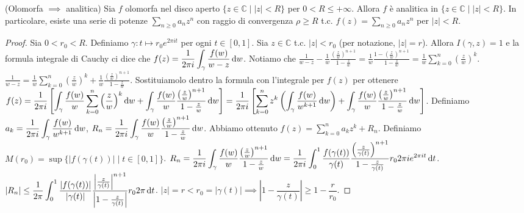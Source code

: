 \begin{thm}
  (Olomorfa $\implies$ analitica) Sia $f$ olomorfa nel disco aperto $\{z \in \mathbb{C} \mid |z|<R\}$ per $0<R\le+\infty$. Allora $f$ è analitica in $\{z \in \mathbb{C} \mid |z|<R\}$. In particolare, esiste una serie di potenze $\displaystyle \sum_{n \ge 0} a_nz^n$ con raggio di convergenza $\rho \ge R$ t.c. $\displaystyle f(z)=\sum_{n \ge 0} a_nz^n$ per $|z|<R$.
\end{thm}

\begin{proof}
  Sia $0<r_0<R$. Definiamo $\gamma:t \longmapsto r_0e^{2\pi i t}$ per ogni $t \in [0,1]$. Sia $z \in \mathbb{C}$ t.c. $|z|<r_0$ (per notazione, $|z|=r$). Allora $I(\gamma,z)=1$ e la formula integrale di Cauchy ci dice che $\displaystyle f(z)=\dfrac{1}{2\pi i}\int_{\gamma}\frac{f(w)}{w-z}\mathop{}\!\mathrm{d} w$.
  Notiamo che $\displaystyle \frac{1}{w-z}-\frac{1}{w}\frac{\left(\frac{z}{w}\right)^{n+1}}{1-\frac{z}{w}}=\frac{1}{w}\frac{1-\left(\frac{z}{w}\right)^{n+1}}{1-\frac{z}{w}}=\frac{1}{w}\sum_{k=0}^n \left(\frac{z}{w}\right)^k$.
  $\displaystyle \frac{1}{w-z}=\frac{1}{w}\sum_{k=0}^n \left(\frac{z}{w}\right)^k+\frac{1}{w}\frac{\left(\frac{z}{w}\right)^{n+1}}{1-\frac{z}{w}}$.
  Sostituiamolo dentro la formula con l'integrale per $f(z)$ per ottenere $\displaystyle f(z)=\frac{1}{2\pi i}\left[\int_{\gamma}\frac{f(w)}{w}\sum_{k=0}^n \left(\frac{z}{w}\right)^k\mathop{}\!\mathrm{d} w+\int_{\gamma}\frac{f(w)}{w}\frac{\left(\frac{z}{w}\right)^{n+1}}{1-\frac{z}{w}}\mathop{}\!\mathrm{d} w\right]=\frac{1}{2\pi i}\left[\sum_{k=0}^n z^k\left(\int_{\gamma} \frac{f(w)}{w^{k+1}}\mathop{}\!\mathrm{d} w\right)+\int_{\gamma}\frac{f(w)}{w}\frac{\left(\frac{z}{w}\right)^{n+1}}{1-\frac{z}{w}}\mathop{}\!\mathrm{d} w\right]$.
  Definiamo $\displaystyle a_k=\frac{1}{2\pi i}\int_{\gamma} \frac{f(w)}{w^{k+1}}\mathop{}\!\mathrm{d} w$, $\displaystyle R_n=\frac{1}{2\pi i}\int_{\gamma}\frac{f(w)}{w}\frac{\left(\frac{z}{w}\right)^{n+1}}{1-\frac{z}{w}}\mathop{}\!\mathrm{d} w$.
  Abbiamo ottenuto $\displaystyle f(z)=\sum_{k=0}^n a_kz^k+R_n$. Definiamo $M(r_0)=\sup\{|f(\gamma(t))| \mid t \in [0,1]\}$.
  $\displaystyle R_n=\frac{1}{2\pi i}\int_{\gamma}\frac{f(w)}{w}\frac{\left(\frac{z}{w}\right)^{n+1}}{1-\frac{z}{w}}\mathop{}\!\mathrm{d} w=\frac{1}{2\pi i}\int_0^1 \frac{f(\gamma(t))}{\gamma(t)}\frac{\left(\frac{z}{\gamma(t)}\right)^{n+1}}{1-\frac{z}{\gamma(t)}}r_02\pi ie^{2\pi it}\mathop{}\!\mathrm{d} t$.
  $\displaystyle |R_n| \le \frac{1}{2\pi}\int_0^1 \frac{|f(\gamma(t))|}{|\gamma(t)|}\frac{\left|\frac{z}{\gamma(t)}\right|^{n+1}}{\left|1-\frac{z}{\gamma(t)}\right|}r_02\pi \mathop{}\!\mathrm{d} t$.
  $|z|=r<r_0=|\gamma(t)| \implies \left|1-\dfrac{z}{\gamma(t)}\right| \ge 1-\dfrac{r}{r_0}$.

\end{proof}
